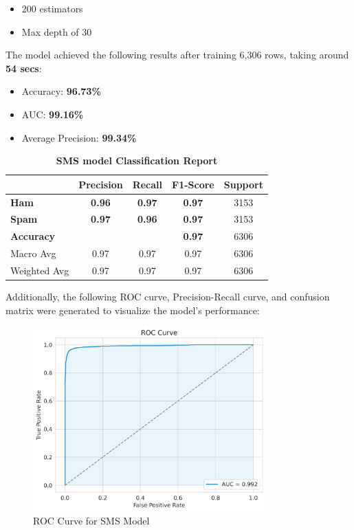 \documentclass{article}
\begin{document}
\begin{itemize}
    \item 200 estimators
    \item Max depth of 30
\end{itemize}

\noindent
The model achieved the following results after training 6,306 rows, taking around \textbf{54 secs}:

\begin{itemize}
    \item Accuracy: \textbf{96.73\%}
    \item AUC: \textbf{99.16\%}
    \item Average Precision: \textbf{99.34\%}
\end{itemize}

\begin{table}[htbp]
    \centering
    \caption{\textbf{SMS model Classification Report}}
    \begin{tabular}{l c c c c}
    \toprule
     & \textbf{Precision} & \textbf{Recall} & \textbf{F1-Score} & Support \\
    \midrule
    \textbf{Ham} & \textbf{0.96} & \textbf{0.97} & \textbf{0.97} & 3153 \\
    \textbf{Spam} & \textbf{0.97} & \textbf{0.96} & \textbf{0.97} & 3153 \\
    \midrule
    \textbf{Accuracy} & & & \textbf{0.97} & 6306 \\
    Macro Avg & 0.97 & 0.97 & 0.97 & 6306 \\
    Weighted Avg & 0.97 & 0.97 & 0.97 & 6306 \\
    \bottomrule
    \end{tabular}
    \label{tab:classification_report_2}
\end{table}

\noindent
Additionally, the following ROC curve, Precision-Recall curve, and confusion matrix were generated to visualize the model's performance:

\begin{figure}[htbp]
    \centering
    \includegraphics[width=0.8\textwidth]{../analysis/sms/randomforest/roc_curve.png}
    \caption{ROC Curve for SMS Model}
    \label{fig:roc_curve_2}
\end{figure}
\end{document}

